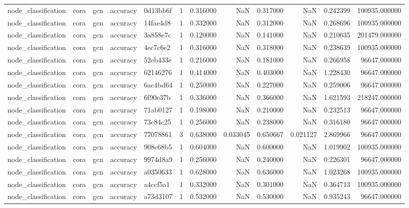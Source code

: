 \begin{tabular}{lllllrrrrrrr}
node_classification & cora & gcn & accuracy & 0d13bb6f & 1 & 0.316000 & NaN & 0.317000 & NaN & 0.242399 & 100935.000000 \\
node_classification & cora & gcn & accuracy & 14fae4d8 & 1 & 0.332000 & NaN & 0.312000 & NaN & 0.268696 & 100935.000000 \\
node_classification & cora & gcn & accuracy & 3a858e7c & 1 & 0.120000 & NaN & 0.141000 & NaN & 0.210635 & 201479.000000 \\
node_classification & cora & gcn & accuracy & 4ec7c6e2 & 1 & 0.316000 & NaN & 0.318000 & NaN & 0.238639 & 100935.000000 \\
node_classification & cora & gcn & accuracy & 52eb433e & 1 & 0.216000 & NaN & 0.181000 & NaN & 0.266958 & 96647.000000 \\
node_classification & cora & gcn & accuracy & 62146276 & 1 & 0.414000 & NaN & 0.403000 & NaN & 1.228430 & 96647.000000 \\
node_classification & cora & gcn & accuracy & 6ac4bd64 & 1 & 0.250000 & NaN & 0.227000 & NaN & 0.259006 & 96647.000000 \\
node_classification & cora & gcn & accuracy & 6f90e37b & 1 & 0.336000 & NaN & 0.366000 & NaN & 1.621593 & 218247.000000 \\
node_classification & cora & gcn & accuracy & 71ab0127 & 1 & 0.198000 & NaN & 0.210000 & NaN & 0.232513 & 96647.000000 \\
node_classification & cora & gcn & accuracy & 73c84c25 & 1 & 0.256000 & NaN & 0.238000 & NaN & 0.316180 & 96647.000000 \\
node_classification & cora & gcn & accuracy & 77078861 & 3 & 0.638000 & 0.033045 & 0.650667 & 0.021127 & 2.869966 & 96647.000000 \\
node_classification & cora & gcn & accuracy & 908c68b5 & 1 & 0.604000 & NaN & 0.600000 & NaN & 1.019902 & 100935.000000 \\
node_classification & cora & gcn & accuracy & 9974d8a9 & 1 & 0.256000 & NaN & 0.240000 & NaN & 0.226301 & 96647.000000 \\
node_classification & cora & gcn & accuracy & a0350633 & 1 & 0.628000 & NaN & 0.636000 & NaN & 1.023268 & 100935.000000 \\
node_classification & cora & gcn & accuracy & a4ccf5a1 & 1 & 0.332000 & NaN & 0.301000 & NaN & 0.364713 & 100935.000000 \\
node_classification & cora & gcn & accuracy & a73d3107 & 1 & 0.532000 & NaN & 0.530000 & NaN & 0.935243 & 96647.000000 \\

\end{tabular}
